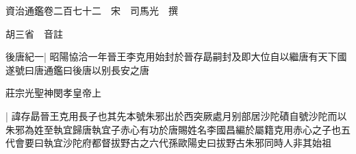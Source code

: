 






























































資治通鑑卷二百七十二　宋　司馬光　撰

胡三省　音註

後唐紀一|{
	昭陽協洽一年晉王李克用始封於晉存勗嗣封及即大位自以繼唐有天下國遂號曰唐通鑑曰後唐以别長安之唐}


莊宗光聖神閔孝皇帝上

|{
	諱存勗晉王克用長子也其先本號朱邪出於西突厥處月别部居沙陀磧自號沙陀而以朱邪為姓至執宜歸唐執宜子赤心有功於唐賜姓名李國昌編於屬籍克用赤心之子也五代會要曰執宜沙陀府都督拔野古之六代孫歐陽史曰拔野古朱邪同時人非其始祖}


